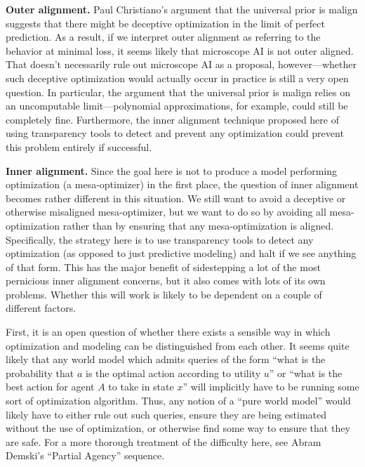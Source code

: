 \documentclass[
  onecolumn,
  natbib,
]{miri-tech-article}
\begin{document}
\textbf{Outer alignment.} Paul Christiano's argument that the universal prior is malign\cite{TODO: cite https://ordinaryideas.wordpress.com/2016/11/30/what-does-the-universal-prior-actually-look-like} suggests that there might be deceptive optimization in the limit of perfect prediction. As a result, if we interpret outer alignment as referring to the behavior at minimal loss\cite{TODO: cite https://www.alignmentforum.org/posts/33EKjmAdKFn3pbKPJ/outer-alignment-and-imitative-amplification}, it seems likely that microscope AI is not outer aligned. That doesn't necessarily rule out microscope AI as a proposal, however---whether such deceptive optimization would actually occur in practice is still a very open question. In particular, the argument that the universal prior is malign relies on an uncomputable limit---polynomial approximations, for example, could still be completely fine. Furthermore, the inner alignment technique proposed here of using transparency tools to detect and prevent any optimization could prevent this problem entirely if successful.

\textbf{Inner alignment.} Since the goal here is not to produce a model performing optimization (a mesa-optimizer) in the first place, the question of inner alignment becomes rather different in this situation. We still want to avoid a deceptive or otherwise misaligned mesa-optimizer, but we want to do so by avoiding all mesa-optimization rather than by ensuring that any mesa-optimization is aligned. Specifically, the strategy here is to use transparency tools to detect any optimization (as opposed to just predictive modeling) and halt if we see anything of that form. This has the major benefit of sidestepping a lot of the most pernicious inner alignment concerns, but it also comes with lots of its own problems. Whether this will work is likely to be dependent on a couple of different factors.

First, it is an open question of whether there exists a sensible way in which optimization and modeling can be distinguished from each other. It seems quite likely that any world model which admits queries of the form ``what is the probability that $a$ is the optimal action according to utility $u$'' or ``what is the best action for agent $A$ to take in state $x$'' will implicitly have to be running some sort of optimization algorithm. Thus, any notion of a ``pure world model'' would likely have to either rule out such queries, ensure they are being estimated without the use of optimization, or otherwise find some way to ensure that they are safe. For a more thorough treatment of the difficulty here, see Abram Demski's ``Partial Agency\cite{TODO: cite https://www.alignmentforum.org/s/HeYtBkNbEe7wpjc6X}'' sequence.
\end{document}
